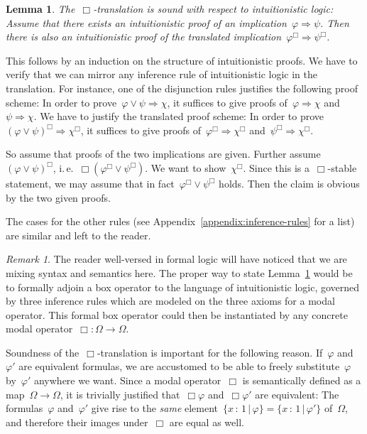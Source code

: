 \documentclass[10pt,reqno,a4paper]{amsbook}
\makeatletter
\theoremstyle{definition}
\theoremstyle{plain}
\newtheorem{lemma}[defn]{Lemma}
\theoremstyle{remark}
\newtheorem{rem}[defn]{Remark}
\newcommand{\?}{\,{:}\,}
\renewcommand{\_}{\mathpunct{.}\,}
\newcommand{\ie}{i.\,e.\@\xspace}
\renewenvironment{proof}[1][\proofname]{\par
  \pushQED{\qed}%
  \normalfont \topsep6\p@\@plus6\p@\relax
  \trivlist
  \item[\hskip\labelsep
        \itshape
    #1\@addpunct{.}]\ignorespaces
}{%
  \popQED\endtrivlist\@endpefalse
}
\makeatother
\begin{document}
\begin{lemma}\label{lemma:box-translation-sound}
The~$\Box$-translation is sound with respect to intuitionistic logic:
Assume that there exists an intuitionistic proof of an
implication~$\varphi \Rightarrow \psi$. Then there is also an intuitionistic
proof of the translated implication~$\varphi^\Box \Rightarrow \psi^\Box$.
\end{lemma}
\begin{proof}This follows by an induction on the structure of intuitionistic
proofs. We have to verify that we can mirror any inference rule of
intuitionistic logic in the translation. For instance, one of the disjunction
rules justifies the following proof scheme: In order to prove~$\varphi \vee
\psi \Rightarrow \chi$, it suffices to give proofs of~$\varphi \Rightarrow
\chi$ and~$\psi \Rightarrow \chi$. We have to justify the translated proof
scheme: In order to prove~$(\varphi \vee \psi)^\Box \Rightarrow \chi^\Box$, it
suffices to give proofs of~$\varphi^\Box \Rightarrow \chi^\Box$ and~$\psi^\Box
\Rightarrow \chi^\Box$.

So assume that proofs of the two implications are given. Further
assume~$(\varphi \vee \psi)^\Box$, \ie~$\Box(\varphi^\Box \vee \psi^\Box)$.
We want to show~$\chi^\Box$. Since this is a~$\Box$-stable statement, we may
assume that in fact~$\varphi^\Box \vee \psi^\Box$ holds. Then the claim is
obvious by the two given proofs.

The cases for the other rules (see Appendix~\ref{appendix:inference-rules} for
a list) are similar and left to the reader.\end{proof}

\begin{rem}The reader well-versed in formal logic will have noticed that we are
mixing syntax and semantics here. The proper way to state Lemma~\ref{lemma:box-translation-sound} would be
to formally adjoin a box operator to the language of intuitionistic logic,
governed by three inference rules which are modeled on the three axioms for a
modal operator. This formal box operator could then be instantiated by any
concrete modal operator~$\Box : \Omega \to \Omega$.\end{rem}

Soundness of the~$\Box$-translation is important for the following reason.
If~$\varphi$ and~$\varphi'$ are equivalent formulas, we are
accustomed to be able to freely substitute~$\varphi$ by~$\varphi'$ anywhere we
want. Since a modal operator~$\Box$ is semantically defined as a map~$\Omega
\to \Omega$, it is trivially justified that~$\Box\varphi$ and~$\Box\varphi'$
are equivalent: The formulas~$\varphi$ and~$\varphi'$ give rise to the
\emph{same} element~$\{x \? 1 \,|\, \varphi\} = \{x \? 1 \,|\, \varphi'\}$
of~$\Omega$, and therefore their images under~$\Box$ are equal as well.
\end{document}
